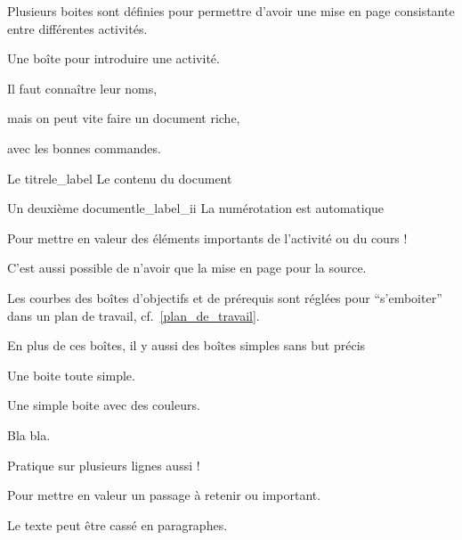 Plusieurs boites sont définies pour permettre d'avoir une mise en page consistante entre différentes activités.
\begin{boiteCodeTex}{}
  \begin{contexte}
    Une boîte pour introduire une activité.
  \end{contexte}

  \begin{prerequis}
    \item Il faut connaître leur noms,
  \end{prerequis}

  \begin{objectifs}
    \item mais on peut vite faire un document riche,
    \item avec les bonnes commandes.
  \end{objectifs}

  \begin{doc}{Le titre}{le_label}
    Le contenu du document
  \end{doc}

  \begin{doc}{Un deuxième document}{le_label_ii}
    La numérotation est automatique
  \end{doc}

  \begin{importants}
    Pour mettre en valeur des éléments importants de l'activité ou du cours !
  \end{importants}

  C'est aussi possible de n'avoir que la mise en page pour la source.
\end{boiteCodeTex}

Les courbes des boîtes d'objectifs et de prérequis sont réglées pour ``s'emboiter'' dans un plan de travail, cf.~\ref{plan_de_travail}.

En plus de ces boîtes, il y aussi des boîtes simples sans but précis
\begin{boiteCodeTex}{}
  \begin{boite}
    Une boite toute simple.
  \end{boite}

  \begin{boiteColoree}
  \end{boiteColoree}
  
  \begin{boiteColoree}[yellow-150]
    Une simple boite avec des couleurs.
  \end{boiteColoree}

  \begin{boiteColoree}[magenta-200]
    Bla bla.

    Pratique sur plusieurs lignes aussi !
  \end{boiteColoree}

  \begin{importants}
    Pour mettre en valeur un passage à retenir ou important.

    Le texte peut être cassé en paragraphes.
  \end{importants}
\end{boiteCodeTex}
